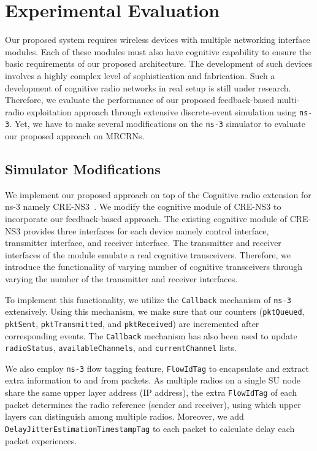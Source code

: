 \chapter{Experimental Evaluation}
\label{chap:results}

Our proposed system requires wireless devices with multiple networking interface modules. Each of these modules must also have cognitive capability to ensure the basic requirements of our proposed architecture. The development of such devices involves a highly complex level of sophistication and fabrication. Such a development of cognitive radio networks in real setup is still under research. Therefore, we evaluate the performance of our proposed feedback-based multi-radio exploitation approach through extensive discrete-event simulation using \texttt{ns-3}. Yet, we have to make several modifications on the \texttt{ns-3} simulator to evaluate our proposed approach on MRCRNs.

\section{Simulator Modifications}

We implement our proposed approach on top of the Cognitive radio extension for ns-3 namely CRE-NS3~\cite{al2014simulating}. We modify the cognitive module of CRE-NS3 to incorporate our feedback-based approach. The existing cognitive module of CRE-NS3 provides three interfaces for each device namely control interface, transmitter interface, and receiver interface. The transmitter and receiver interfaces of the module emulate a real cognitive transceivers. Therefore, we introduce the functionality of varying number of cognitive transceivers through varying the number of the transmitter and receiver interfaces.

To implement this functionality, we utilize the \texttt{Callback} mechanism of \texttt{ns-3} extensively. Using this mechanism, we make sure that our counters (\texttt{pktQueued}, \texttt{pktSent}, \texttt{pktTransmitted}, and \texttt{pktReceived}) are incremented after corresponding events. The \texttt{Callback} mechanism has also been used to update \texttt{radioStatus}, \texttt{availableChannels}, and \texttt{currentChannel} lists.

 We also employ \texttt{ns-3} flow tagging feature, \texttt{FlowIdTag} to encapsulate and extract extra information to and from packets. As multiple radios on a single SU node share the same upper layer address (IP address), the extra \texttt{FlowIdTag} of each packet determines the radio reference (sender and receiver), using which upper layers can distinguish among multiple radios. Moreover, we add \texttt{DelayJitterEstimationTimestampTag} to each packet to calculate delay each packet experiences.

